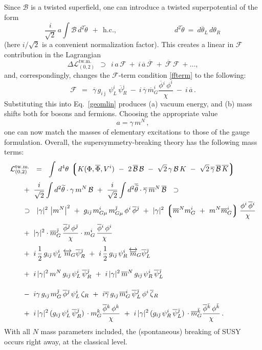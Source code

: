 \documentclass[12pt]{article}
\newcommand{\wt}{\widetilde}
\newcommand{\ov}{\overline}
\newcommand{\mc}[1]{\mathcal{#1}}
\newcommand{\lgr}{\left\lgroup}
\newcommand{\rgr}{\right\rgroup}
\newcommand{\bzr}{\ov{\zeta}{}_R}
\newcommand{\zr}{\zeta_R}
\newcommand{\bgamma}{\ov{\gamma}}
\newcommand{\bpsi}{\ov{\psi}{}}
\newcommand{\bphi}{\ov{\phi}{}}
\newcommand{\ff}{\mc{F}}
\newcommand{\bff}{\ov{\mc{F}}}
\newcommand{\bj}{{\bar \jmath}}
\newcommand{\bk}{{\bar k}}
\begin{document}
	Since $ \mc{B} $ is a twisted superfield, one can introduce a twisted superpotential of the form
\[
	\frac{i}{\sqrt{2}}\,a \int \mc{B}\, d^2\wt{\theta} ~~+~~ \text{h.c.},
	\qquad\qquad\qquad\qquad d^2\wt{\theta} ~=~ d\ov{\theta}{}_L\,d\theta_R\,
\]
	(here $ i/\sqrt{2} $ is a convenient normalization factor).
	This creates a linear in $ \ff $ contribution in the Lagrangian
\[
	\Delta\mc{L}_{(0,2)}^\text{tw.m.} ~~\supset~~ i\,a\,\ff ~+~ i\,\ov{a}\,\bff ~+~ \bff\,\ff ~+ \dots,
\]
	and, correspondingly, changes the $ \ff $-term condition \eqref{ffterm} to the following:
\[
	\ff ~~=~~ \bgamma\, g_{i\bj}\, \psi_L^i\, \bpsi_R^\bj 
		~-~ i\, \bgamma\, \ov{m}_G^i \frac{\bphi^i\, \phi^i}{\chi}
		~-~ i\, \ov{a}\,.
\]
	Substituting this into Eq.~\eqref{geomlin} produces (a) vacuum energy, and (b) mass shifts both for
	bosons and fermions.
	Choosing the appropriate value $$ a = \gamma\,m^N \,,$$ one can now match the masses
	of elementary excitations  to those of the
	gauge formulation.
	Overall, the supersymmetry-breaking theory has the following mass terms:
\begin{align}
%
\notag
	\mc{L}_{(0,2)}^\text{tw.m.} & 
	~~=~~ \int\, d^4\theta\, \lgr K(\Phi,\ov{\Phi}, V^i) 
		~-~ 2\, \ov{\mc{B}}\,\mc{B}  
		~-~  \sqrt{2}\, \gamma\,\mc{B}\,K  ~-~ \sqrt{2}\, \ov{\gamma}\,\ov{\mc{B}}\,\ov{K} \rgr
	\\[1mm]
%
\notag
	&\!\!\!\!\!\!\!\!
	~+~ \frac{i}{\sqrt{2}} \int d^2\wt{\theta} \cdot \gamma\,m^N\,\mc{B} 
	~+~ \frac{i}{\sqrt{2}} \int d^2\ov{\wt{\theta}} \cdot \bgamma\, \ov{m}{}^N\, \ov{\mc{B}}
	~~\supset~~
	\\
%
\notag
	&\!\!\!\!\!\!\!\!
	~\supset~~
	|\gamma|^2\, \left|m^N\right|^2 
	~+~ g_{i\bj}\, m_{G\mu}^i\, m_{G\mu}^\bj\, \phi^i\, \bphi^\bj
	~+~ |\gamma|^2\, \lgr \ov{m}{}^N m_G^i ~+~ m^N \ov{m}{}_G^i \rgr \frac {\phi^i\,\bphi^i}{\chi}
	\\[1mm]
%
\label{geom_mass}
	&\!\!\!\!\!\!\!\!
	~+~ |\gamma|^2 \cdot \ov{m}{}_G^\bj\,\frac{\bphi^\bj\,\phi^\bj}{\chi}
			\cdot m_G^i\, \frac{\bphi^i\, \phi^i}{\chi}
	\\[1mm]
%
\notag
	&\!\!\!\!\!\!\!\!
	~+~ i\,\frac{1}{2}\,g_{i\bj}\,\psi_L^i\, \overleftrightarrow{m}{}_{\!G} \bpsi_R^\bj
	~+~ i\,\frac{1}{2}\,g_{i\bj}\,\psi_R^i\, \overleftrightarrow{\ov{m}}{}_{\!G} \bpsi_L^\bj
	\\[3mm]
%
\notag
	&\!\!\!\!\!\!\!\!
	~+~ i\,|\gamma|^2\,m^N\,g_{i\bj}\,\psi_L^i\, \bpsi_R^\bj
	~+~ i\,|\gamma|^2\,\ov{m}{}^N\,g_{i\bj}\,\psi_R^i\, \bpsi_L^\bj
	\\[4mm]
%
\notag
	&\!\!\!\!\!\!\!\!
	~-~ i\gamma\, g_{i\bj}\, m_G^\bj\,\bphi^\bj\, \psi_L^i\,\zr
	~+~ i\bgamma\, g_{i\bj}\,\ov{m}{}_G^i\, \bpsi_L^\bj\, \phi^i\,\bzr
	\\[1mm]
%
\notag
	&\!\!\!\!\!\!\!\!
	~+~ i\, |\gamma|^2\, (g_{i\bj}\,\psi_L^i\,\bpsi_R^\bj)\, \cdot m_G^k \frac{\bphi^k\, \phi^k}{\chi}
	~+~ i\, |\gamma|^2\, (g_{i\bj}\,\psi_R^i\,\bpsi_L^\bj)\, \cdot \ov{m}{}_G^\bk \frac{\bphi^\bk\,\phi^\bk}{\chi}
	\,.
\end{align}
With all $N$ mass parameters included, the (spontaneous) breaking of SUSY occurs right away, 
at the classical level.
\end{document}
